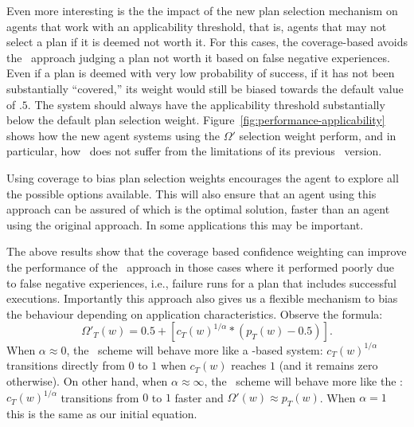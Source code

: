 Even more interesting is the the impact of the new plan selection mechanism on
agents that work with an applicability threshold, that is, agents that may not
select a plan if it is deemed not worth it. For this cases, the coverage-based
avoids the \CL\ approach judging a plan not worth it based on false negative
experiences. Even if a plan is deemed with very low probability of success, if it
has not been substantially ``covered,'' its weight would still be biased towards the
default value of $.5$. The system should always have
the applicability threshold substantially below the default plan selection
weight.
Figure~\ref{fig:performance-applicability} shows how the new agent systems
using the $\Omega'$ selection weight perform, and in particular, how \CLSELB\
does not suffer from the limitations of its previous \CLSELA\ version.

Using coverage to bias plan selection weights encourages the agent to
explore all the possible options available. 
This will also ensure that
an agent using this approach can be assured of which is the optimal
solution, faster than an agent using the original approach. In some
applications this may be important.


The above results show that the coverage based confidence weighting
can improve the performance of the \CL\ approach in those
cases where it performed poorly due to false negative experiences,
i.e., failure runs for a plan that includes successful executions.
%
Importantly this approach also gives us a flexible mechanism to bias the 
behaviour depending on application characteristics. Observe the formula:
\begin{equation*}\label{eqn:coverage*}
\Omega'_T(w) = 0.5 + \left[  c_T(w)^{1/\alpha} *  \left( p_T(w) - 0.5 \right)
\right].
\end{equation*}
\noindent When $\alpha \approx 0$, the \CLSELB\ scheme will behave more
like a \BULSELA-based system: $c_T(w)^{1/\alpha}$ transitions directly from $0$
to $1$ when $c_T(w)$ reaches $1$ (and it remains zero otherwise).
On other hand, when $\alpha \approx \infty$, the \CLSELB\ scheme will behave more
like the \CLSELA: $c_T(w)^{1/\alpha}$ transitions from $0$ to $1$ faster and
$\Omega'(w) \approx p_T(w)$.
%
When $\alpha=1$ this is the same as our initial equation.


